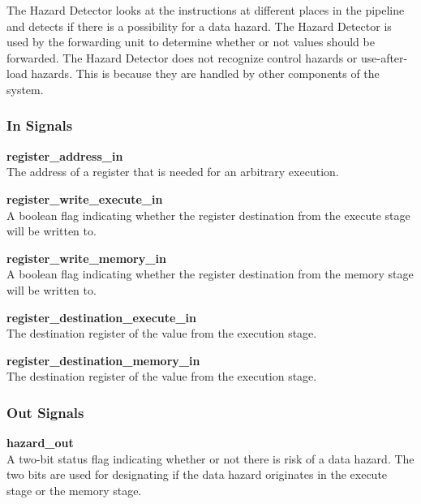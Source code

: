 The Hazard Detector looks at the instructions at different places in the pipeline and detects if there is a possibility for a data hazard.
The Hazard Detector is used by the forwarding unit to determine whether or not values should be forwarded.
The Hazard Detector does not recognize control hazards or use-after-load hazards.
This is because they are handled by other components of the system.

\subsubsection{In Signals}

\begin{description}
\item{\textbf{register\_address\_in}} \\
    The address of a register that is needed for an arbitrary execution.

\item{\textbf{register\_write\_execute\_in}} \\
    A boolean flag indicating whether the register destination from the execute stage will be written to.

\item{\textbf{register\_write\_memory\_in}} \\
    A boolean flag indicating whether the register destination from the memory stage will be written to.

\item{\textbf{register\_destination\_execute\_in}} \\
    The destination register of the value from the execution stage.
\item{\textbf{register\_destination\_memory\_in}} \\
    The destination register of the value from the execution stage.

\end{description}

\subsubsection{Out Signals}

\begin{description}
\item{\textbf{hazard\_out}} \\
    A two-bit status flag indicating whether or not there is risk of a data hazard. The two bits are used for designating if the data hazard originates in the execute stage or the memory stage.
\end{description}
